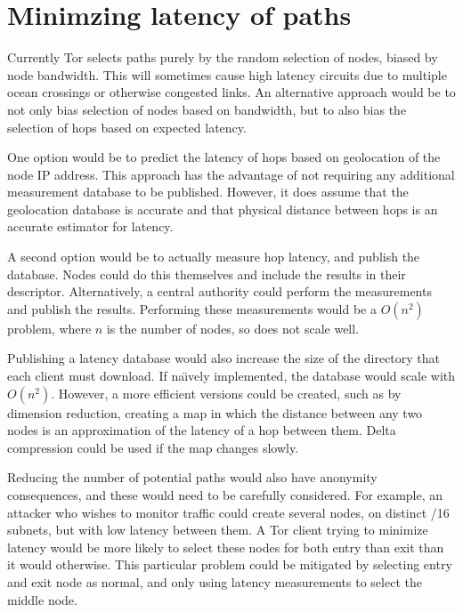 \documentclass{article}
\title{\thetitle}
\author{Steven J. Murdoch}
\begin{document}
\thispagestyle{plain}
 
\maketitle

\section{Minimzing latency of paths}

Currently Tor selects paths purely by the random selection of nodes, biased by node bandwidth.
This will sometimes cause high latency circuits due to multiple ocean crossings or otherwise congested links.
An alternative approach would be to not only bias selection of nodes based on bandwidth, but to also bias the selection of hops based on expected latency.

One option would be to predict the latency of hops based on geolocation of the node IP address.
This approach has the advantage of not requiring any additional measurement database to be published.
However, it does assume that the geolocation database is accurate and that physical distance between hops is an accurate estimator for latency.

A second option would be to actually measure hop latency, and publish the database.
Nodes could do this themselves and include the results in their descriptor.
Alternatively, a central authority could perform the measurements and publish the results.
Performing these measurements would be a $O(n^2)$ problem, where $n$ is the number of nodes, so does not scale well.

Publishing a latency database would also increase the size of the directory that each client must download.
If na\"{\i}vely implemented, the database would scale with $O(n^2)$.
However, a more efficient versions could be created, such as by dimension reduction, creating a map in which the distance between any two nodes is an approximation of the latency of a hop between them.
Delta compression could be used if the map changes slowly.

Reducing the number of potential paths would also have anonymity consequences, and these would need to be carefully considered.
For example, an attacker who wishes to monitor traffic could create several nodes, on distinct /16 subnets, but with low latency between them.
A Tor client trying to minimize latency would be more likely to select these nodes for both entry than exit than it would otherwise.
This particular problem could be mitigated by selecting entry and exit node as normal, and only using latency measurements to select the middle node.
\end{document}
